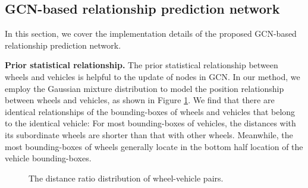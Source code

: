 \documentclass{article}
\begin{document}
\subsection{GCN-based relationship prediction network}

In this section, we cover the implementation details of the proposed GCN-based relationship prediction network.







\textbf{Prior statistical relationship.} The prior statistical relationship between wheels and vehicles is helpful to the update of nodes in GCN. In our method, we employ the Gaussian mixture distribution to model the position relationship between wheels and vehicles, as shown in Figure \ref{fig:Figure06}. We find that there are identical relationships of the bounding-boxes of wheels and vehicles that belong to the identical vehicle: For most bounding-boxes of vehicles, the distances with its subordinate wheels are shorter than that with other wheels. Meanwhile, the most bounding-boxes of wheels generally locate in the bottom half location of the vehicle bounding-boxes. 

% 
\begin{figure}[!h]
    \centering
    \caption{The distance ratio distribution of wheel-vehicle pairs.}
    \label{fig:Figure06}
\end{figure}
\end{document}
